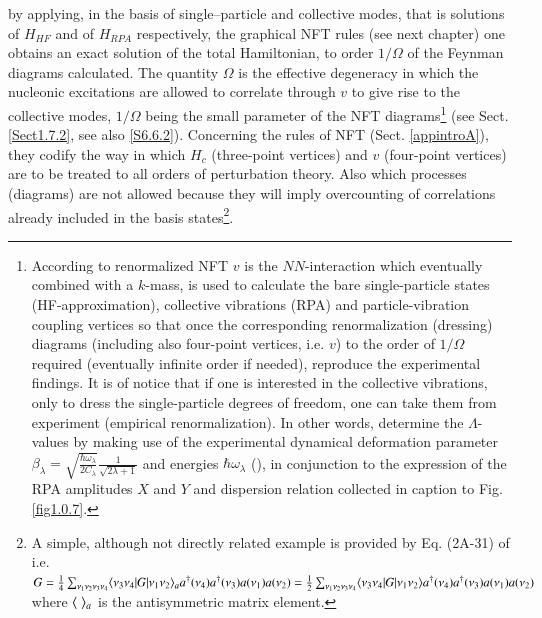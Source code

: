 by applying,  in the basis of single--particle and collective modes, that is solutions of $H_{HF}$ and of $H_{RPA}$ respectively, the graphical  NFT rules  (see next chapter) one obtains an exact solution of the total Hamiltonian, to order $1/\Omega$ of the Feynman diagrams calculated. The quantity $\Omega$ is the effective degeneracy in which the nucleonic excitations are allowed to correlate through $v$ to give rise to the collective modes, $1/\Omega$ being the small parameter of the NFT diagrams\footnote{According to renormalized NFT $v$ is the $NN$-interaction which eventually combined with a $k$-mass, is used to calculate the bare single-particle states (HF-approximation), collective vibrations (RPA) and particle-vibration coupling vertices so that once the corresponding renormalization (dressing) diagrams (including also four-point vertices, i.e. $v$) to the order of $1/\Omega$ required (eventually infinite order if needed), reproduce the experimental findings. It is of notice that if one is interested in the collective vibrations, only to dress the single-particle degrees of freedom, one can take them from experiment (empirical renormalization). In other words, determine the $\Lambda$-values by making use of the experimental dynamical deformation parameter $\beta_\lambda=\sqrt{\frac{\hbar\omega_\lambda}{2C_\lambda}}\frac{1}{\sqrt{2\lambda+1}}$ and energies $\hbar\omega_\lambda$ (\cite{Broglia:16}), in conjunction to the expression of the RPA amplitudes $X$ and $Y$ and dispersion relation collected in caption to Fig. \ref{fig1.0.7}.} (see Sect. \ref{Sect1.7.2}, see also \ref{S6.6.2}). Concerning the rules of NFT (Sect. \ref{appintroA}), they codify the way in which $H_c$ (three-point vertices) and $v$ (four-point vertices) are to be treated to all orders of perturbation theory. Also which processes (diagrams) are not allowed because they will imply overcounting of correlations already included in the basis states\footnote{A simple, although not directly related example is provided by Eq. (2A-31) of \cite{Bohr:69} i.e. $G=\tfrac{1}{4}\sum_{\nu_1\nu_2\nu_3\nu_4}\langle {\nu_3\nu_4|G|\nu_1\nu_2} \rangle_ aa^\dagger(\nu_4)a^\dagger(\nu_3)a(\nu_1)a(\nu_2)=\tfrac{1}{2}\sum_{\nu_1\nu_2\nu_3\nu_4}\langle {\nu_3\nu_4|G|\nu_1\nu_2} \rangle a^\dagger(\nu_4)a^\dagger(\nu_3)a(\nu_1)a(\nu_2)$ where $\langle {\;} \rangle_a$ is the antisymmetric matrix element.}. 

